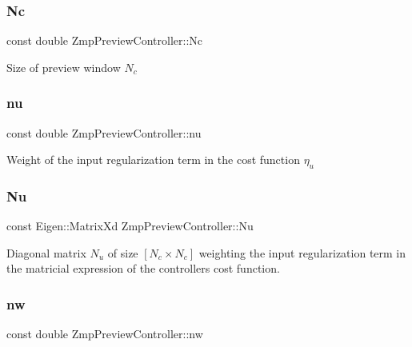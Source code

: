 \subsubsection{\texorpdfstring{Nc}{Nc}}
{\footnotesize\ttfamily const double Zmp\+Preview\+Controller\+::\+Nc\hspace{0.3cm}{\ttfamily [private]}}

Size of preview window $ N_c $ \hypertarget{classZmpPreviewController_ac611f084023404faba1ccfab573cd81d}{}\label{classZmpPreviewController_ac611f084023404faba1ccfab573cd81d} 
\subsubsection{\texorpdfstring{nu}{nu}}
{\footnotesize\ttfamily const double Zmp\+Preview\+Controller\+::nu\hspace{0.3cm}{\ttfamily [private]}}

Weight of the input regularization term in the cost function $\eta_u$ \hypertarget{classZmpPreviewController_ac3e92145988993ede7ce2060b997c8db}{}\label{classZmpPreviewController_ac3e92145988993ede7ce2060b997c8db} 
\subsubsection{\texorpdfstring{Nu}{Nu}}
{\footnotesize\ttfamily const Eigen\+::\+Matrix\+Xd Zmp\+Preview\+Controller\+::\+Nu\hspace{0.3cm}{\ttfamily [private]}}

Diagonal matrix $N_u$ of size $[N_c \times N_c]$ weighting the input regularization term in the matricial expression of the controller\textquotesingle{}s cost function. \hypertarget{classZmpPreviewController_a783427b817d77469e1f80426bede5310}{}\label{classZmpPreviewController_a783427b817d77469e1f80426bede5310} 
\subsubsection{\texorpdfstring{nw}{nw}}
{\footnotesize\ttfamily const double Zmp\+Preview\+Controller\+::nw\hspace{0.3cm}{\ttfamily [private]}}

